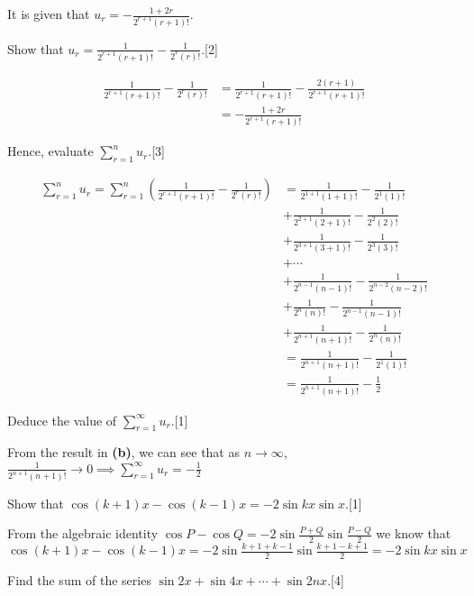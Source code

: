 \documentclass[12pt, a4 paper]{article}
\begin{document}
\begin{outline}[enumerate]
 \1 It is given that \(u_{r}=-\frac{1+2r}{2^{r+1}(r+1)!}\). %

 \2 Show that \(u_{r}=\frac{1}{2^{r+1}(r+1)!}-\frac{1}{2^{r}(r)!}\).\hfill[2]
\begin{answer}
  \begin{align*}
    \frac{1}{2^{r+1}(r+1)!}-\frac{1}{2^{r}(r)!} &= \frac{1}{2^{r+1}(r+1)!}-\frac{2(r+1)}{2^{r+1}(r+1)!} \\
    &= -\frac{1+2r}{2^{r+1}(r+1)!}
  \end{align*}
\end{answer}
 \2 Hence, evaluate \(\sum\limits_{r=1}^{n}u_r\).\hfill[3]
\begin{answer}
  \begin{align*}
    \sum\limits_{r=1}^{n}u_r = \sum\limits_{r=1}^{n}\left(\frac{1}{2^{r+1}(r+1)!}-\frac{1}{2^{r}(r)!}\right) &= \frac{1}{2^{1+1}(1+1)!}-\frac{1}{2^{1}(1)!} \\
    & +\frac{1}{2^{2+1}(2+1)!}-\frac{1}{2^{2}(2)!} \\
    & +\frac{1}{2^{3+1}(3+1)!}-\frac{1}{2^{3}(3)!} \\
    & +\cdots \\
    & +\frac{1}{2^{n-1}(n-1)!}-\frac{1}{2^{n-2}(n-2)!} \\
    & +\frac{1}{2^{n}(n)!}-\frac{1}{2^{n-1}(n-1)!} \\
    & +\frac{1}{2^{n+1}(n+1)!}-\frac{1}{2^{n}(n)!} \\
    &= \frac{1}{2^{n+1}(n+1)!} - \frac{1}{2^{1}(1)!} \\
    &= \frac{1}{2^{n+1}(n+1)!} - \frac{1}{2}
  \end{align*}
\end{answer}
 \2 Deduce the value of \(\sum\limits_{r=1}^{\infty}u_r\).\hfill[1]
 \begin{answer}
   From the result in \textbf{(b)}, we can see that as \(n \to
   \infty \), \(\frac{1}{2^{n+1}(n+1)!} \to 0 \implies \sum\limits_{r=1}^{\infty}u_r = -\frac{1}{2}\)
 \end{answer}
 \1
 \2 Show that \(\cos{(k+1)}x-\cos{(k-1)x}=-2\sin{kx}\sin{x}\).\hfill[1]
\begin{answer}
  From the algebraic identity \(\cos P - \cos Q = -2\sin\frac{P+Q}{2}\sin\frac{P-Q}{2}\) we know that \(\cos{(k+1)}x-\cos{(k-1)x} = -2\sin\frac{k+1+k-1}{2}\sin\frac{k+1-k+1}{2} = -2\sin{kx}\sin x\)
\end{answer}
 \2 Find the sum of the series \(\sin{2x}+\sin{4x}+\cdots+\sin{2nx}\).\hfill[4]%
 \begin{answer}

\end{answer}
\end{outline}
\end{document}
